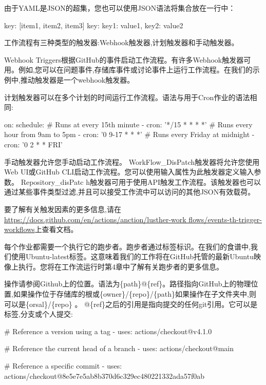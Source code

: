 由于YAML是JSON的超集，您也可以使用JSON语法将集合放在一行中：

\begin{shell}
key: [item1, item2, item3]
key: {key1: value1, key2: value2}
\end{shell}


工作流程有三种类型的触发器:Webhook触发器,计划触发器和手动触发器。

Webhook Triggers根据GitHub的事件启动工作流程。有许多Webhook触发器可用。例如,您可以在问题事件,存储库事件或讨论事件上运行工作流程。在我们的示例中,推动触发器是一个webhook触发器。

计划触发器可以在多个计划的时间运行工作流程。语法与用于Cron作业的语法相同:

\begin{shell}
on:
  schedule:
    # Runs at every 15th minute
    - cron: '*/15 * * * *'
    # Runs every hour from 9am to 5pm
    - cron: '0 9-17 * * *'
    # Runs every Friday at midnight
    - cron: '0 2 * * FRI'
\end{shell}

手动触发器允许您手动启动工作流程。 WorkFlow\_DisPatch触发器将允许您使用Web UI或GitHub CLI启动工作流程。您可以使用输入属性为此触发器定义输入参数。 Repository\_disPatc h触发器可用于使用API触发工作流程。该触发器也可以通过某些事件类型过滤,并且可以接受工作流中可以访问的其他JSON有效载荷。

要了解有关触发因素的更多信息,请在\url{https://docs.github.com/en/actions/anction/lusther-work flows/events-th-trigger-workflows}上查看文档。


每个作业都需要一个执行它的跑步者。跑步者通过标签标识。在我们的食谱中,我们使用Ubuntu-latest标签。这意味着我们的工作将在GitHub托管的最新Ubuntu映像上执行。您将在工作流运行时第4章中了解有关跑步者的更多信息。


操作请参阅Github上的位置。语法为\{path\}@\{ref\}。路径指向GitHub上的物理位置,如果操作位于存储库的根或\{owner\}/\{repo\}/\{path\}如果操作在子文件夹中,则可以是\{orsal\}/\{repo\} 。 @\{ref\}之后的引用是指向提交的任何git引用。它可以是标签,分支或个人提交:

\begin{shell}
# Reference a version using a tag
- uses: actions/checkout@v4.1.0

# Reference the current head of a branch
- uses: actions/checkout@main

# Reference a specific commit
- uses: actions/checkout@8e5e7e5ab8b370d6c329ec480221332ada57f0ab
\end{shell}

